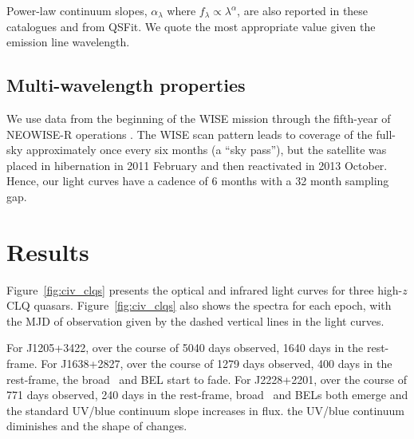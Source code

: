 \documentclass[a4paper,fleqn,usenatbib]{mnras}
\begin{document}
Power-law continuum slopes, $\alpha_{\lambda}$ where $f_{\lambda}
\propto \lambda^{\alpha}$, are also reported in these catalogues and
from QSFit.  We quote the most appropriate value given the emission
line wavelength.

\subsection{Multi-wavelength properties}
We use data from the beginning of the WISE mission \citep[2010
January; ][]{Wright2010} through the fifth-year of NEOWISE-R
operations \citep[2018 December; ][]{Mainzer2011}. The WISE scan
pattern leads to coverage of the full-sky approximately once every six
months (a ``sky pass''), but the satellite was placed in hibernation
in 2011 February and then reactivated in 2013 October. Hence, our
light curves have a cadence of 6 months with a 32 month sampling gap.



\section{Results}
Figure~\ref{fig:civ_clqs} presents the optical and infrared light
curves for three high-$z$ CLQ quasars.  Figure~\ref{fig:civ_clqs} also
shows the spectra for each epoch, with the MJD of observation given by
the dashed vertical lines in the light curves.

For J1205+3422, over the course of 5040 days observed, 1640 days in
the rest-frame.  For J1638+2827, over the course of 1279 days
observed, 400 days in the rest-frame, the broad \civ\ and \ciii BEL
start to fade.  For J2228+2201, over the course of 771 days observed,
240 days in the rest-frame, broad \civ\ and \ciii BELs both emerge and
the standard UV/blue continuum slope increases in flux.  the UV/blue
continuum diminishes and the shape of \lya changes.
\end{document}
